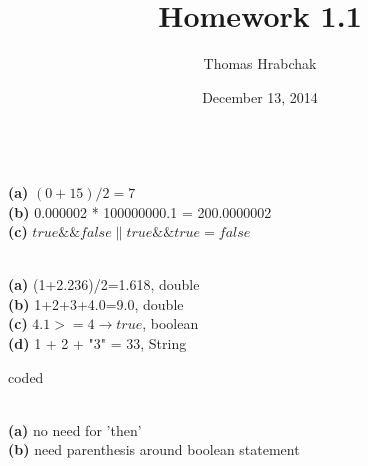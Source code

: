 \documentclass[10pt,a4paper]{article}
\title{Homework 1.1}
\author{Thomas Hrabchak}
\date{December 13, 2014}
\newenvironment{problem}[2][Problem]{\begin{trivlist}
	\item[\hskip \labelsep {\bfseries #1}\hskip \labelsep {\bfseries #2}]}{\end{trivlist}}
\renewcommand\part[1]{\vspace{.10in}\textbf{\\(#1)}}
\begin{document}
\maketitle

\begin{problem}{1.1.1}
\end{problem}
\part{a} \( (0+15)/2 =7 \)
\part{b} 0.000002 * 100000000.1 = 200.0000002
\part{c} \( true \&\& false \| true \&\& true = false \)

\begin{problem}{1.1.2}
\end{problem}

\part{a} (1+2.236)/2=1.618, double
\part{b} 1+2+3+4.0=9.0, double
\part{c} \(4.1 >= 4 \rightarrow true\), boolean
\part{d} 1 + 2 + "3" = 33, String

\begin{problem}{1.1.3}coded
\end{problem}

\begin{problem}{1.1.4}
\end{problem}

\part{a} no need for 'then'
\part{b} need parenthesis around boolean statement
\end{document}
